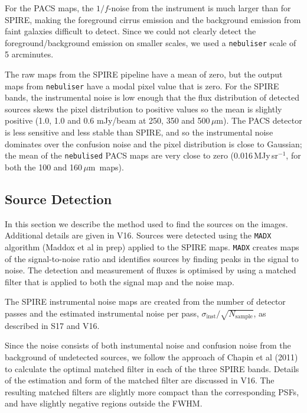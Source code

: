 \documentclass[a4paper,fleqn,usenatbib, twocolumn]{aastex61}
\def\mic{\,$\mu $m}
\begin{document}
For the PACS maps, the $1/f$-noise from the instrument is much larger than
for SPIRE, making the foreground cirrus emission and the background
emission from faint galaxies difficult to detect. Since we could not
clearly detect the foreground/background emission on smaller
scales, we used a {\tt nebuliser} scale of 5 arcminutes.

The raw maps from the SPIRE pipeline have a mean of zero, but the
output maps from {\tt nebuliser} have a modal pixel value that is
zero. For the SPIRE bands, the instrumental noise is low enough that
the flux distribution of detected sources skews the pixel distribution
to positive values so the mean is slightly positive (1.0, 1.0 and 0.6
mJy/beam at 250, 350 and 500\mic).  The PACS detector is less
sensitive and less stable than SPIRE, and so the instrumental noise
dominates over the confusion noise and the pixel distribution is close
to Gaussian; the mean of the {\tt nebulised} PACS maps are very close
to zero (0.016\,MJy\,sr$^{-1}$, for both the 100 and 160\mic\ maps).

\subsection{Source Detection} 


In this section we describe the method used to find the
sources on the images. Additional details are given in V16.
Sources were detected using the {\tt MADX} algorithm (Maddox et al in prep)
applied to the SPIRE maps.  {\tt MADX} creates maps of the signal-to-noise
ratio and identifies sources by finding peaks in the signal to noise. The
detection and measurement of fluxes is optimised by using a matched
filter that is applied to both the signal map and the noise map. 

The SPIRE instrumental noise maps are created from the number of
detector passes and the estimated instrumental noise per pass,
$\sigma_{\mathrm{inst}} /\sqrt{N_ {\mathrm{sample}}}$, as described in S17 and V16.

 
Since the noise consists of both instumental noise and
confusion noise from the background of undetected sources, we follow
the approach of Chapin et al (2011) to calculate the optimal matched
filter in each of the three SPIRE bands. Details of the estimation and
form of the matched filter are discussed in V16.  The resulting
matched filters are slightly more compact than the corresponding PSFs,
and have slightly negative regions outside the FWHM.  
\end{document}
